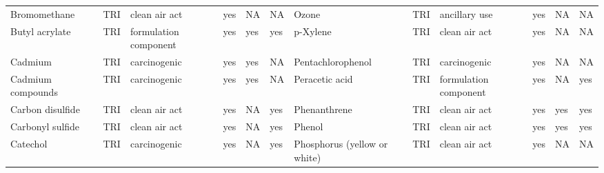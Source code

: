 \begin{table}[H]
{\begin{tabular}{llllllllllll}
            Bromomethane                                                               & TRI            & clean air act         & yes    & NA      & NA   & Ozone                                                                                                              & TRI            & ancillary use         & yes    & NA      & NA   \\
            Butyl acrylate                                                             & TRI            & formulation component & yes    & yes     & yes  & p-Xylene                                                                                                           & TRI            & clean air act         & yes & NA & NA\\
            Cadmium                                                                    & TRI            & carcinogenic          & yes    & yes     & NA   & Pentachlorophenol                                                                                                  & TRI            & carcinogenic          & yes    & NA      & NA   \\
            Cadmium compounds                                                          & TRI            & carcinogenic          & yes    & yes     & NA   & Peracetic acid                                                                                                     & TRI            & formulation component & yes & NA & yes\\
            Carbon disulfide                                                           & TRI            & clean air act         & yes    & NA      & yes  & Phenanthrene                                                                                                       & TRI            & clean air act         & yes & yes & yes\\
            Carbonyl sulfide                                                           & TRI            & clean air act         & yes    & NA      & yes  & Phenol                                                                                                             & TRI            & clean air act         & yes    & yes     & yes  \\
            Catechol                                                                   & TRI            & carcinogenic          & yes    & NA      & yes  & Phosphorus (yellow or white)                                                                                       & TRI            & clean air act & yes & NA & NA\\

\end{tabular}}
\end{table}

